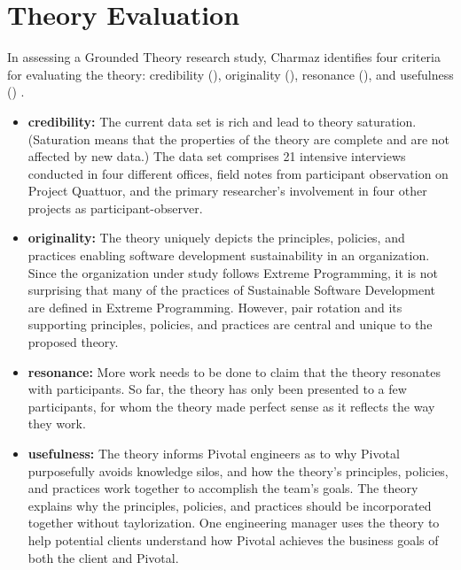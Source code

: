 \section{Theory Evaluation}
\label{TheoryEvaluation}

In assessing a Grounded Theory research study, Charmaz identifies four criteria for evaluating the theory: credibility (), originality (), resonance (), and usefulness () \cite{StolGTinSE}. 

\begin{itemize}
\item 
\textbf{credibility:}  The current data set is rich and lead to theory saturation. (Saturation means that the properties of the theory are complete and are not affected by new data.) The data set comprises 21 intensive interviews conducted in four different offices,  field notes from participant observation on Project Quattuor, and the primary researcher's involvement in four other projects as participant-observer.

\item
\textbf{originality:} The theory uniquely depicts the principles, policies, and practices enabling software development sustainability in an organization. Since the organization under study follows Extreme Programming, it is not surprising that many of the practices of Sustainable Software Development are defined in Extreme Programming. However, pair rotation and its supporting principles, policies, and practices are central and unique to the proposed theory.

\item
\textbf{resonance:} More work needs to be done to claim that the theory resonates with participants. So far, the theory has only been presented to a few participants, for whom the theory made perfect sense as it reflects the way they work. 

\item
\textbf{usefulness:}  The theory informs Pivotal engineers as to why Pivotal purposefully avoids knowledge silos, and how the theory's principles, policies, and practices work together to accomplish the team's goals.  The theory explains why the principles, policies, and practices should be incorporated together without taylorization. One engineering manager uses the theory to help potential clients understand how Pivotal achieves the business goals of both the client and Pivotal.

\end{itemize}

